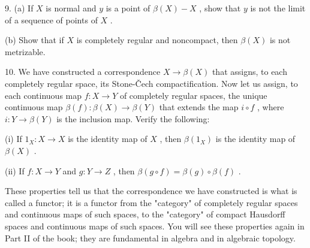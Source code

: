 9. (a) If \(X\) is normal and \(y\) is a point of \(\beta \left( X\right)  - X\) , show that \(y\) is not the limit of a sequence of points of \(X\) .

(b) Show that if \(X\) is completely regular and noncompact, then \(\beta \left( X\right)\) is not metrizable.

10. We have constructed a correspondence \(X \rightarrow  \beta \left( X\right)\) that assigns, to each completely regular space, its Stone-Čech compactification. Now let us assign, to each continuous map \(f : X \rightarrow  Y\) of completely regular spaces, the unique continuous map \(\beta \left( f\right)  : \beta \left( X\right)  \rightarrow  \beta \left( Y\right)\) that extends the map \(i \circ  f\) , where \(i : Y \rightarrow  \beta \left( Y\right)\) is the inclusion map. Verify the following:

(i) If \({1}_{X} : X \rightarrow  X\) is the identity map of \(X\) , then \(\beta \left( {1}_{X}\right)\) is the identity map of \(\beta \left( X\right)\) .

(ii) If \(f : X \rightarrow  Y\) and \(g : Y \rightarrow  Z\) , then \(\beta \left( {g \circ  f}\right)  = \beta \left( g\right)  \circ  \beta \left( f\right)\) .

These properties tell us that the correspondence we have constructed is what is called a functor; it is a functor from the "category" of completely regular spaces and continuous maps of such spaces, to the "category" of compact Hausdorff spaces and continuous maps of such spaces. You will see these properties again in Part II of the book; they are fundamental in algebra and in algebraic topology.